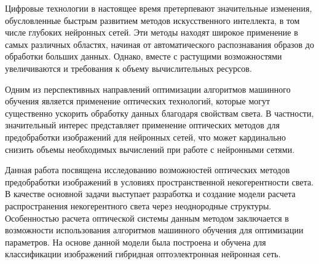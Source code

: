 Цифровые технологии в настоящее время претерпевают значительные изменения, обусловленные быстрым развитием методов искусственного интеллекта, в том числе глубоких нейронных сетей. Эти методы находят широкое применение в самых различных областях, начиная от автоматического распознавания образов до обработки больших данных. Однако, вместе с растущими возможностями увеличиваются и требования к объему вычислительных ресурсов.
\par
Одним из перспективных направлений оптимизации алгоритмов машинного обучения является применение оптических технологий, которые могут существенно ускорить обработку данных благодаря свойствам света. В частности, значительный интерес представляет применение оптических методов для предобработки изображений для нейронных сетей, что может кардинально снизить объемы необходимых вычислений при работе с нейронными сетями.
\par
Данная работа посвящена исследованию возможностей оптических методов предобработки изображений в условиях пространственной некогерентности света. В качестве основной задачи выступает разработка и создание модели расчета распространения некогерентного света через неоднородные структуры. Особенностью расчета оптической системы данным методом заключается в возможности использования алгоритмов машинного обучения для оптимизации параметров. На основе данной модели была построена и обучена для классификации изображений гибридная оптоэлектронная нейронная сеть.